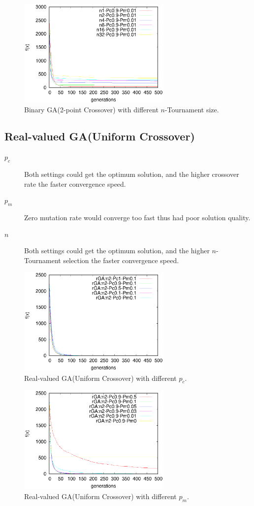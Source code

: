 ﻿\documentclass[conference]{IEEEtran}
\begin{document}
\begin{CJK}{UTF8}{bsmi}
\begin{figure}[htbp]
\centerline{\includegraphics[width=7.5cm]{fig/bGA/change_n_2pt.eps}}
\caption{Binary GA(2-point Crossover) with different $n$-Tournament size.}
\label{fig}
\end{figure}

\subsection{Real-valued GA(Uniform Crossover)}
\begin{description}
\item [$p_{c}$] Both settings could get the optimum solution, and the higher crossover rate the faster convergence speed.
\item [$p_{m}$] Zero mutation rate would converge too fast thus had poor solution quality.
\item [$n$] Both settings could get the optimum solution, and the higher $n$-Tournament selection the faster convergence speed.
\end{description}

\begin{figure}[htbp]
\centerline{\includegraphics[width=7.5cm]{fig/rGA/change_pc_uni.eps}}
\caption{Real-valued GA(Uniform Crossover) with different $p_{c}$.}
\label{fig}
\end{figure}

\begin{figure}[htbp]
\centerline{\includegraphics[width=7.5cm]{fig/rGA/change_pm_uni.eps}}
\caption{Real-valued GA(Uniform Crossover) with different $p_{m}$.}
\label{fig}
\end{figure}


\end{CJK}
\end{document}
